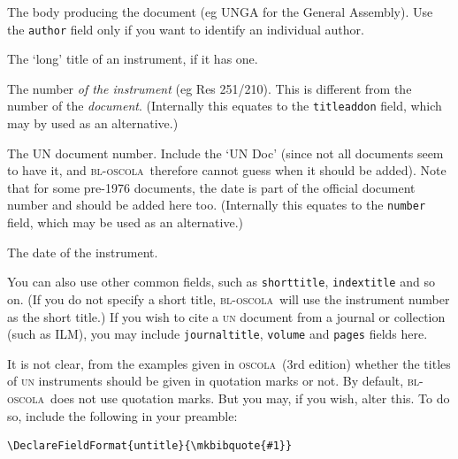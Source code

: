 \documentclass[a4paper,
               11pt,
	       DIV=1,			   
	       footinclude=false]
	      {scrartcl}
\newcommand{\oscola}{\textsc{bl-oscola}}
\newcommand{\oscolashort}{\textsc{oscola}\nocite{oscola}}
\begin{document}
\begin{description}
\item[institution] The body producing the document (eg UNGA for the General Assembly). Use the \texttt{author} field only if you want to identify an individual author.
\item[title] The `long' title of an instrument, if it has one.
\item[instrument\_no] The number \emph{of the instrument} (eg Res 251/210). This is different from the
number of the \emph{document}. (Internally this equates to the \texttt{titleaddon} field, which may
by used as an alternative.)
\item[doc\_no] The UN document number. Include the `UN Doc' (since not all documents seem to have it, and \oscola\ therefore
cannot guess when it should be added). Note that for some pre-1976 documents, the date is part of the official document number
and should be added here too. (Internally this equates to the \texttt{number} field, which may be used as an alternative.)
\item[date] The date of the instrument.
\end{description}

You can also use other common fields, such as \texttt{shorttitle}, \texttt{indextitle} and so on. (If you do not
specify a short title, \oscola\ will use the instrument number as the short title.) If you wish to cite a \textsc{un} document 
from a journal or collection (such as ILM), you may include \texttt{journaltitle}, \texttt{volume} and \texttt{pages} fields here.

It is not clear, from the examples given in \oscolashort\ (3rd edition) whether the 
titles of \textsc{un} instruments should be given in quotation marks or not.
By default, \oscola\ does not use quotation marks. But you may, if you wish, alter this. To do so,
include the following in your preamble:
\begin{verbatim}
\DeclareFieldFormat{untitle}{\mkbibquote{#1}}
\end{verbatim}
\end{document}
